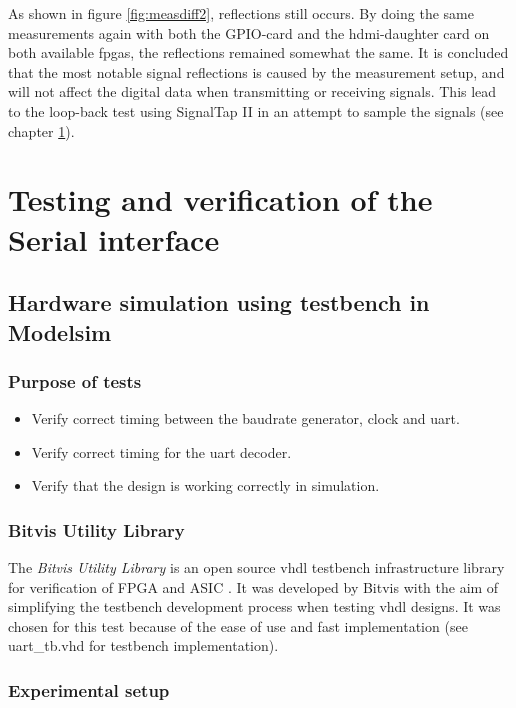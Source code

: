 \documentclass[main.tex]{subfiles}
\begin{document}
As shown in figure \ref{fig:measdiff2}, reflections still occurs. By doing the same measurements again with both the GPIO-card and the \gls{hdmi}-daughter card on both available \glspl{fpga}, the reflections remained somewhat the same. It is concluded that the most notable signal reflections is caused by the measurement setup, and will not affect the digital data when transmitting or receiving signals. This lead to the loop-back test using SignalTap II in an attempt to sample the signals (see chapter \ref{chap:sertest}).

\chapter{Testing and verification of the Serial interface} \label{chap:sertest}

\section{Hardware simulation using testbench in Modelsim}

\subsection{Purpose of tests}

\begin{itemize}\setlength{\itemsep}{10pt}
\item Verify correct timing between the baudrate generator, clock and uart.
\item Verify correct timing for the uart decoder.
\item Verify that the design is working correctly in simulation.
\end{itemize}

\subsection{Bitvis Utility Library}
The \textit{Bitvis Utility Library} is an open source \gls{vhdl} testbench infrastructure library for verification of FPGA and ASIC \cite{bitvis16}. It was developed by Bitvis with the aim of simplifying the testbench development process when testing \gls{vhdl} designs. It was chosen for this test because of the ease of use and fast implementation (see uart\_tb.vhd for testbench implementation).

\subsection{Experimental setup}
\end{document}
